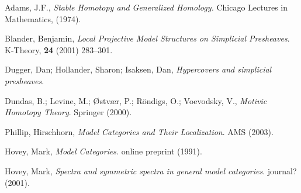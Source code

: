 \documentclass{amsart}%
\begin{document}
\begin{thebibliography}{OOOO}
     Adams, J.F., {\it Stable Homotopy and
    Generalized Homology.} Chicago Lectures in Mathematics, (1974).


     Blander, Benjamin, {\it Local Projective
    Model Structures on Simplicial Presheaves}. K-Theory, {\bf 24}
  (2001) 283--301.



     Dugger, Dan; Hollander, Sharon; Isaksen, Dan,
  {\it Hypercovers and simplicial presheaves}.

     Dundas, B.; Levine, M.;
  {\O}stv{\ae}r, P.; R\"ondigs, O.; Voevodsky, V., {\it Motivic
    Homotopy Theory}. Springer (2000).





     Phillip, Hirschhorn, {\it Model Categories
    and Their Localization}. AMS (2003).

     Hovey, Mark, {\it Model Categories}.
  online preprint (1991).
  
     Hovey, Mark, {\it Spectra and symmetric
    spectra in general model categories}. journal? (2001).



\end{thebibliography}
\end{document}
